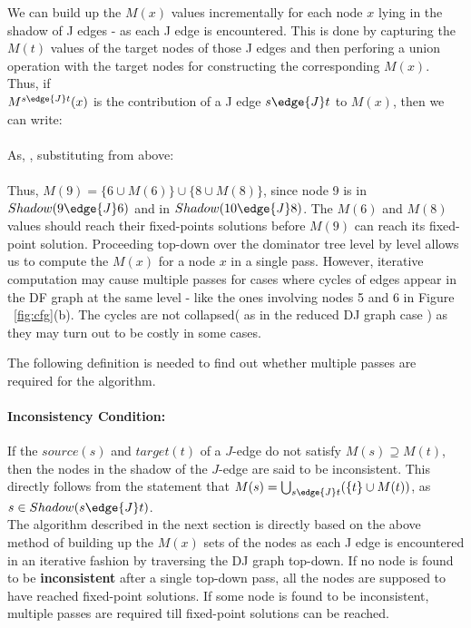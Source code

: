 We can build up the $M(x)$ values incrementally for each node $x$ lying in the shadow of J edges - as
each J edge is encountered. This is done by capturing the $M(t)$ values of the target nodes of those
J edges and then perforing a union operation with the target nodes for constructing the
corresponding $M(x)$. Thus, if \\
$M^{s \edge{J} t}(x)$ is the contribution of a J edge $s \edge{J} t$ to $M(x)$, then we can write: \\
 \\
As, , substituting from above: \\
\\
Thus, $M(9) = \{ 6 \cup M(6) \} \cup \{8 \cup M(8) \}$, since node 9 is in $Shadow(9 \edge{J} 6)$
and in $Shadow(10 \edge{J} 8)$. The $M(6)$ and $M(8)$ values should reach their fixed-points solutions
before $M(9)$ can reach its fixed-point solution. Proceeding top-down over the
dominator tree level by level allows us to compute the $M(x)$ for a node $x$
in a single pass. However, iterative computation may cause multiple passes for cases where
cycles of edges appear in the DF graph at the same level - like the ones involving nodes 5 and 6
in Figure ~\ref{fig:cfg}(b). The cycles are not collapsed( as in the reduced DJ graph case ) as they
may turn out to be costly in some cases.

The following definition is needed to find out whether multiple passes are required for the algorithm.

\paragraph{Inconsistency Condition:}

If the $source(s)$ and $target(t)$ of a $J$-edge do not satisfy
$M(s)\supseteq M(t)$, then the nodes in the shadow of the
$J$-edge are said to be inconsistent. This directly follows from the statement that
$M(s) = \bigcup_{s \edge{J} t}(\{t\} \cup M(t))$, as $s\in Shadow(s \edge{J} t)$.\\

The algorithm described in the next section is directly based on the above method of building
up the $M(x)$ sets of the nodes as each J edge is encountered in an iterative fashion by
traversing the DJ graph top-down. If no node is found to be {\bf inconsistent} after a single 
top-down pass, all the nodes are supposed to have reached fixed-point solutions. If some node
is found to be inconsistent, multiple passes are required till fixed-point solutions can be
reached.

